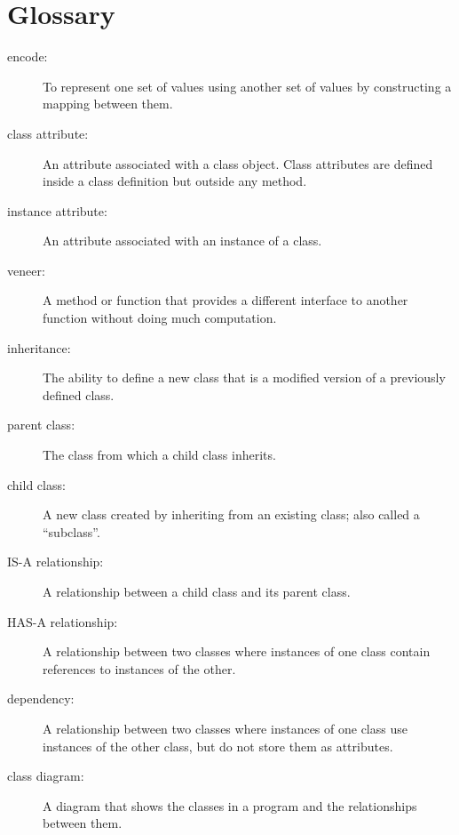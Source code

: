 \documentclass[
DIV=11,
fontsize=13,
twoside,
headinclude=false,
titlepage=firstiscover,
abstract=true,
headsepline=true,
footsepline=true,
chapterprefix=true, %
headings=big,
bibliography=totoc,%
captions=tableheading
]{scrbook}
\theoremstyle{definition}
\begin{document}
\section{Glossary}

\begin{description}

\item[encode:]  To represent one set of values using another
set of values by constructing a mapping between them.

\item[class attribute:] An attribute associated with a class
object.  Class attributes are defined inside
a class definition but outside any method.

\item[instance attribute:] An attribute associated with an
instance of a class.

\item[veneer:] A method or function that provides a different
interface to another function without doing much computation.

\item[inheritance:] The ability to define a new class that is a
modified version of a previously defined class.

\item[parent class:] The class from which a child class inherits.

\item[child class:] A new class created by inheriting from an
existing class; also called a ``subclass''.

\item[IS-A relationship:] A relationship between a child class
and its parent class.

\item[HAS-A relationship:] A relationship between two classes
where instances of one class contain references to instances of
the other.

\item[dependency:] A relationship between two classes
where instances of one class use instances of the other class,
but do not store them as attributes.

\item[class diagram:] A diagram that shows the classes in a program
and the relationships between them.


\end{description}
\end{document}
